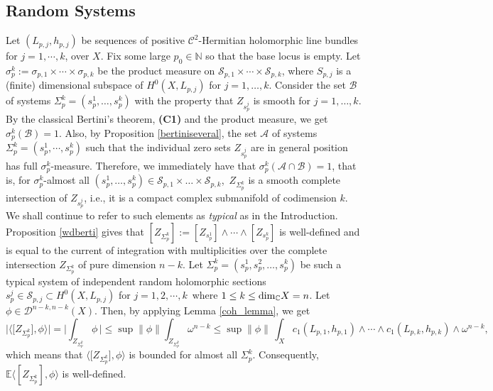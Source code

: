 \documentclass[11pt,leqno,oneside]{amsart}
\numberwithin{equation}{section}
\begin{document}
\subsection{Random Systems}\label{sc3.1}
Let $(L_{p, j}, h_{p, j})$ be sequences of positive $\mathscr{C}^{2}$-Hermitian holomorphic line bundles for $j=1, \cdots, k$, over $X$. Fix some large $p_{0} \in \mathbb{N}$ so that the base locus is empty. Let $\sigma_{p}^{k}:=\sigma_{p, 1} \times \cdots \times \sigma_{p, k}$ be the product measure on $\mathcal{S}_{p, 1} \times \cdots \times \mathcal{S}_{p, k}$, where $S_{p, j}$ is a (finite) dimensional subspace of $H^{0}(X, L_{p, j})$ for $j=1, \ldots, k$. Consider the set $\mathcal{B}$ of systems $\Sigma^k_{p}=(s^{1}_{p}, \ldots, s^{k}_{p})$ with the property that $Z_{s^{j}_{p}}$ is smooth for $j=1, \ldots, k$. By the classical Bertini's theorem, \textbf{(C1)} and the product measure, we get $\sigma^{k}_{p}(\mathcal{B})=1$. Also, by Proposition \ref{bertiniseveral}, the set $\mathcal{A}$ of systems $\Sigma^{k}_{p}=(s^{1}_{p}, \cdots, s^{k}_{p})$ such that the individual zero sets $Z_{s^{j}_{p}}$ are in general position has full $\sigma^{k}_{p}$-measure. Therefore, we immediately have that $\sigma^k_{p}(\mathcal{A} \cap \mathcal{B})=1$, that is, for $\sigma^{k}_{p}$-almost all $(s^{1}_{p}, \ldots, s^{k}_{p}) \in \mathcal{S}_{p, 1} \times \ldots \times \mathcal{S}_{p, k}$, \,$Z_{\Sigma_{p}^{k}}$ is a smooth complete intersection of $Z_{s^{j}_{p}}$, i.e., it is a compact complex submanifold of codimension $k$. We shall continue to refer to such elements as \textit{typical} as in the Introduction. Proposition \ref{wdberti} gives that $[Z_{\Sigma^{k}_{p}}]:= [Z_{s^{1}_{p}}] \wedge \cdots \wedge [Z_{s^{k}_{p}}]$ is well-defined and is equal to the current of integration with multiplicities over the complete intersection $Z_{\Sigma^{k}_{p}}$ of pure dimension $n-k$. Let $\Sigma^{k}_{p}=(s^{1}_{p}, s^{2}_{p},\ldots , s^{k}_{p})$ be such a typical system of independent random holomorphic sections $s_{p}^{j}\in \mathcal{S}_{p, j} \subset H^{0}(X,L_{p, j})$ for $j=1,2, \cdots,k\,$ where $1\leq k \leq \textup{dim}_{\mathbb{C}}X=n$. Let $\phi \in \mathcal{D}^{n-k, n-k}(X)$. Then, by applying Lemma \ref{coh_lemma}, we get
\begin{equation}\label{uniboex}
\big|\big \langle \big[Z_{\Sigma_{p}^{k}}\big], \phi \big \rangle\big|=\Big|\int_{Z_{\Sigma_{p}^{k}}}\phi \, \Big|\leq \sup \left \| \phi \right \| \int_{Z_{\Sigma_{p}^{k}}}{\omega ^{n-k}} \leq \sup \left \| \phi \right \| \,\int_{X}c_{1}(L_{p, 1}, h_{p, 1})\wedge \cdots \wedge c_{1}(L_{p, k}, h_{p, k}) \wedge \omega^{n-k},\end{equation}
which means that $\big \langle \big[Z_{\Sigma_{p}^{k}}\big], \phi \big \rangle$ is bounded  for  almost all $\Sigma_{p}^{k} .$ Consequently,  $\mathbb{E}\langle [Z_{\Sigma_{p}^{k}}], \phi \rangle$ is well-defined.
\end{document}
